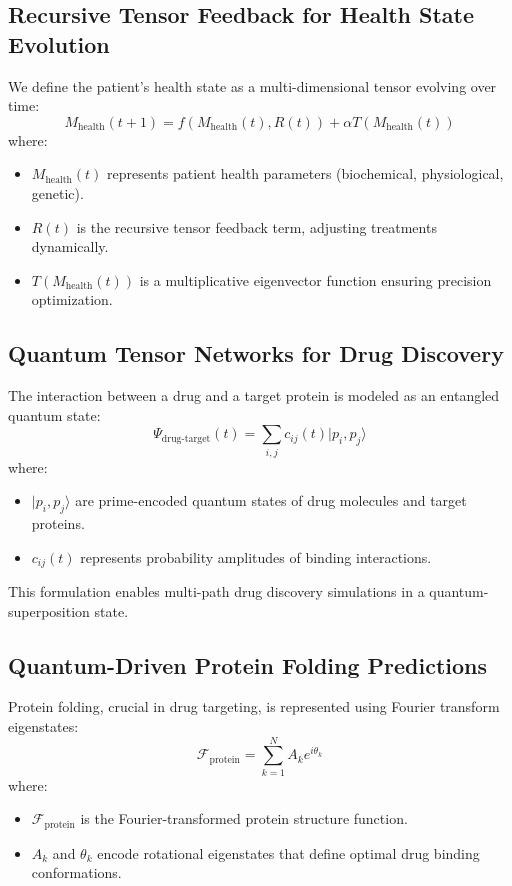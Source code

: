 \documentclass{article}
\theoremstyle{plain}
\begin{document}
\subsection{Recursive Tensor Feedback for Health State Evolution}
We define the patient's health state as a multi-dimensional tensor evolving over time:
\begin{equation}
    M_{\text{health}}(t+1) = f(M_{\text{health}}(t), R(t)) + \alpha T(M_{\text{health}}(t))
\end{equation}
where:
\begin{itemize}
    \item \( M_{\text{health}}(t) \) represents patient health parameters (biochemical, physiological, genetic).
    \item \( R(t) \) is the recursive tensor feedback term, adjusting treatments dynamically.
    \item \( T(M_{\text{health}}(t)) \) is a multiplicative eigenvector function ensuring precision optimization.
\end{itemize}

\subsection{Quantum Tensor Networks for Drug Discovery}
The interaction between a drug and a target protein is modeled as an entangled quantum state:
\begin{equation}
    \Psi_{\text{drug-target}}(t) = \sum_{i,j} c_{ij}(t) | p_i, p_j \rangle
\end{equation}
where:
\begin{itemize}
    \item \( | p_i, p_j \rangle \) are prime-encoded quantum states of drug molecules and target proteins.
    \item \( c_{ij}(t) \) represents probability amplitudes of binding interactions.
\end{itemize}

This formulation enables multi-path drug discovery simulations in a quantum-superposition state.

\subsection{Quantum-Driven Protein Folding Predictions}
Protein folding, crucial in drug targeting, is represented using Fourier transform eigenstates:
\begin{equation}
    \mathcal{F}_{\text{protein}} = \sum_{k=1}^{N} A_k e^{i\theta_k}
\end{equation}
where:
\begin{itemize}
    \item \( \mathcal{F}_{\text{protein}} \) is the Fourier-transformed protein structure function.
    \item \( A_k \) and \( \theta_k \) encode rotational eigenstates that define optimal drug binding conformations.
\end{itemize}
\end{document}
